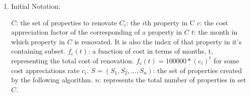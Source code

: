 \documentclass[11pt]{article}
\begin{document}
\begin{flushleft}
\begin{enumerate}
{\begin{enumerate}
				      					      		      				      		\item {
				      					      		      				      			      Initial Notation:\linebreak
				      					      		      				      			      \linebreak
				      					      		      				      			      \begin{center}
				      					      		      				      			      	$C$: the set of properties to renovate\linebreak
				      					      		      				      			      	$C_i$: the $i$th property in C\linebreak
				      					      		      				      			      	$c$: the cost appreciation factor of the corresponding of a property in $C$\linebreak
				      					      		      				      			      	$t$: the month in which property in $C$ is renovated. It is also the index of that property in it's containing subset.\linebreak
				      					      		      				      			      	$f_c(t)$: a function of cost in terms of months, t, representing the total cost of renovation. $f_c(t) = 100000 * (c_i)^t$ for some cost appreciations rate $c_i$.\linebreak
				      					      		      				      			      	$S = (S_1, S_2, ..., S_n)$: the set of properties created by the following algorithm.\linebreak
				      					      		      				      			      	$n$: represents the total number of properties in set $C$.\linebreak
				      					      		      				      			      	

\end{center}}
\end{enumerate}}
\end{enumerate}
\end{flushleft}
\end{document}
